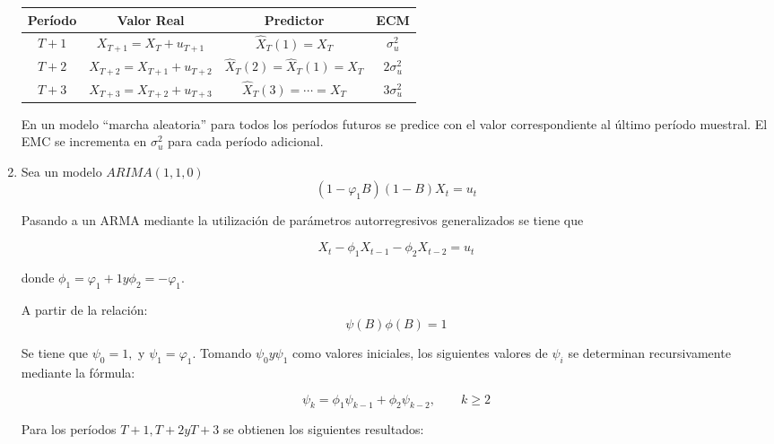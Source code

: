 \begin{ejemplo}
\begin{enumerate}
\begin{center}
\small
\begin{tabular}{@{}cccc@{}}
\toprule
\textbf{Per\'{i}odo}& \textbf{Valor Real}& \textbf{Predictor}& \textbf{ECM} \\
\midrule
$T+1$& $X_{T+1} =X_{T} +u_{T+1} $& $\widehat{{X}}_{T} \left( 1 \right)=X_{T} $&
$\sigma_{u}^{2}$ \\[5pt]
$T+2$& $X_{T+2} =X_{T+1} +u_{T+2} $& $\widehat{{X}}_{T} \left( 2 \right)=\widehat{{X}}_{T} \left( 1 \right)=X_{T} $& $2\sigma_{u}^{2}$ \\[5pt]
$T+3$& $X_{T+3} =X_{T+2} +u_{T+3} $& $\widehat{{X}}_{T} \left( 3 \right)=\cdots =X_{T} $& $3\sigma_{u}^{2}$ \\
\bottomrule
\end{tabular}
\end{center}


En un modelo ``marcha aleatoria'' para todos los per\'{i}odos futuros se predice con el valor correspondiente al \'{u}ltimo per\'{i}odo muestral. El EMC se incrementa en $\sigma_{u}^{2}$ para cada per\'{i}odo adicional.

\item Sea un modelo $ARIMA( {1,1,0})$
\[
\left( {1-\varphi_{1} B} \right)\left( {1-B} \right)X_{t} =u_{t} 
\]

Pasando a un ARMA mediante la utilizaci\'{o}n de par\'{a}metros autorregresivos generalizados se tiene que

\[
X_{t} -\phi_{1} X_{t-1} -\phi_{2} X_{t-2} =u_{t} 
\]

donde $\phi_{1} =\varphi_{1} +1y\phi_{2} =-\varphi_{1}$.\newline

A partir de la relaci\'{o}n:
\[
\psi \left( B \right)\phi \left( B \right)=1
\]

Se tiene que $\psi_{0} =1,$ y $\psi_{1} =\varphi_{1} .$ Tomando $\psi_{0} y\psi_{1} $ como valores iniciales, los siguientes valores de $\psi_{i} $ se determinan recursivamente mediante la f\'{o}rmula:

\[
\psi_{k} =\phi_{1} \psi_{k-1} +\phi_{2} \psi_{k-2} ,\qquad k\ge 2
\]

Para los per\'{i}odos $T+1,T+2yT+3$ se obtienen los siguientes resultados:


\end{enumerate}
\end{ejemplo}
